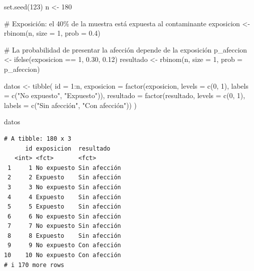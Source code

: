\documentclass[
  spanish,
  a4paper,
]{scrreport}
\newenvironment{Shaded}{\begin{snugshade}}{\end{snugshade}}
\newcommand{\AttributeTok}[1]{\textcolor[rgb]{0.40,0.45,0.13}{#1}}
\newcommand{\CommentTok}[1]{\textcolor[rgb]{0.37,0.37,0.37}{#1}}
\newcommand{\DecValTok}[1]{\textcolor[rgb]{0.68,0.00,0.00}{#1}}
\newcommand{\FloatTok}[1]{\textcolor[rgb]{0.68,0.00,0.00}{#1}}
\newcommand{\FunctionTok}[1]{\textcolor[rgb]{0.28,0.35,0.67}{#1}}
\newcommand{\NormalTok}[1]{\textcolor[rgb]{0.00,0.23,0.31}{#1}}
\newcommand{\OtherTok}[1]{\textcolor[rgb]{0.00,0.23,0.31}{#1}}
\newcommand{\SpecialCharTok}[1]{\textcolor[rgb]{0.37,0.37,0.37}{#1}}
\newcommand{\StringTok}[1]{\textcolor[rgb]{0.13,0.47,0.30}{#1}}
\theoremstyle{definition}
\theoremstyle{definition}
\theoremstyle{remark}
\begin{document}
\begin{Shaded}
\begin{Highlighting}[]
\FunctionTok{set.seed}\NormalTok{(}\DecValTok{123}\NormalTok{)}
\NormalTok{n }\OtherTok{\textless{}{-}} \DecValTok{180}

\CommentTok{\# Exposición: el 40\% de la muestra está expuesta al contaminante}
\NormalTok{exposicion }\OtherTok{\textless{}{-}} \FunctionTok{rbinom}\NormalTok{(n, }\AttributeTok{size =} \DecValTok{1}\NormalTok{, }\AttributeTok{prob =} \FloatTok{0.4}\NormalTok{)}

\CommentTok{\# La probabilidad de presentar la afección depende de la exposición}
\NormalTok{p\_afeccion }\OtherTok{\textless{}{-}} \FunctionTok{ifelse}\NormalTok{(exposicion }\SpecialCharTok{==} \DecValTok{1}\NormalTok{, }\FloatTok{0.30}\NormalTok{, }\FloatTok{0.12}\NormalTok{)}
\NormalTok{resultado }\OtherTok{\textless{}{-}} \FunctionTok{rbinom}\NormalTok{(n, }\AttributeTok{size =} \DecValTok{1}\NormalTok{, }\AttributeTok{prob =}\NormalTok{ p\_afeccion)}

\NormalTok{datos }\OtherTok{\textless{}{-}} \FunctionTok{tibble}\NormalTok{(}
  \AttributeTok{id =} \DecValTok{1}\SpecialCharTok{:}\NormalTok{n,}
  \AttributeTok{exposicion =} \FunctionTok{factor}\NormalTok{(exposicion, }\AttributeTok{levels =} \FunctionTok{c}\NormalTok{(}\DecValTok{0}\NormalTok{, }\DecValTok{1}\NormalTok{), }\AttributeTok{labels =} \FunctionTok{c}\NormalTok{(}\StringTok{"No expuesto"}\NormalTok{, }\StringTok{"Expuesto"}\NormalTok{)),}
  \AttributeTok{resultado =} \FunctionTok{factor}\NormalTok{(resultado, }\AttributeTok{levels =} \FunctionTok{c}\NormalTok{(}\DecValTok{0}\NormalTok{, }\DecValTok{1}\NormalTok{), }\AttributeTok{labels =} \FunctionTok{c}\NormalTok{(}\StringTok{"Sin afección"}\NormalTok{, }\StringTok{"Con afección"}\NormalTok{))}
\NormalTok{)}

\NormalTok{datos}
\end{Highlighting}
\end{Shaded}

\begin{verbatim}
# A tibble: 180 x 3
      id exposicion  resultado   
   <int> <fct>       <fct>       
 1     1 No expuesto Sin afección
 2     2 Expuesto    Sin afección
 3     3 No expuesto Sin afección
 4     4 Expuesto    Sin afección
 5     5 Expuesto    Sin afección
 6     6 No expuesto Sin afección
 7     7 No expuesto Sin afección
 8     8 Expuesto    Sin afección
 9     9 No expuesto Con afección
10    10 No expuesto Con afección
# i 170 more rows
\end{verbatim}
\end{document}
